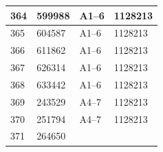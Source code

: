 \documentclass[UTF8,10pt,a4paper,fontset=fandol]{ctexart}
\newcommand{\fieldvalue}[1]{#1}
\begin{document}
\begin{center}
\begin{tabular}{|l|l|l|l|}
\hline
\fieldvalue{364}&
\fieldvalue{599988}&
\fieldvalue{A1--6}&
\fieldvalue{1128213}\\
\hline
\fieldvalue{365}&
\fieldvalue{604587}&
\fieldvalue{A1--6}&
\fieldvalue{1128213}\\
\hline
\fieldvalue{366}&
\fieldvalue{611862}&
\fieldvalue{A1--6}&
\fieldvalue{1128213}\\
\hline
\fieldvalue{367}&
\fieldvalue{626314}&
\fieldvalue{A1--6}&
\fieldvalue{1128213}\\
\hline
\fieldvalue{368}&
\fieldvalue{633442}&
\fieldvalue{A1--6}&
\fieldvalue{1128213}\\
\hline
\fieldvalue{369}&
\fieldvalue{243529}&
\fieldvalue{A4--7}&
\fieldvalue{1128213}\\
\hline
\fieldvalue{370}&
\fieldvalue{251794}&
\fieldvalue{A4--7}&
\fieldvalue{1128213}\\
\hline
\fieldvalue{371}&
\fieldvalue{264650}&

\end{tabular}
\end{center}
\end{document}
